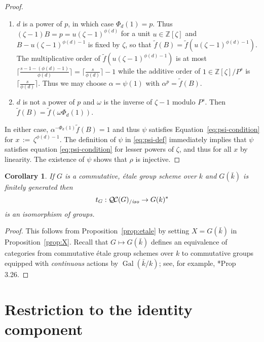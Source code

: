\documentclass[11pt]{amsart}
\theoremstyle{plain}
\newtheorem{corollary}[theorem]{Corollary}
\theoremstyle{definition}
\theoremstyle{remark}
\newcommand{\ZZ}{{\mathbb{Z}}}
\newcommand{\bFq}{\bar{k}}
\newcommand{\Fq}{k}
\DeclareMathOperator{\Gal}{Gal}
\newcommand{\ceq}{{\, :=\, }}
\newcommand{\QC}{{\mathcal{Q\hskip-0.8pt C}}}
\newcommand{\QCiso}[1]{\QC(#1)_{/\textit{iso}}}
\newcommand{\trFrob}[1]{t_{#1}}
\begin{document}
\begin{proof}
  \begin{enumerate}
  \item $d$ is a power of $p$, in which case $\Phi_d(1) = p$.  Thus
    $(\zeta-1)B = p = u(\zeta-1)^{\phi(d)}$ for a unit $u \in \ZZ[\zeta]$
    and $B - u(\zeta-1)^{\phi(d)-1}$ is fixed by $\zeta$,
    so that $\tilde{f}(B) = \tilde{f}(u(\zeta - 1)^{\phi(d)-1})$.  The
    multiplicative order of $\tilde{f}(u(\zeta-1)^{\phi(d)-1})$ is at most
    $\lceil \frac{s - 1 - (\phi(d)-1)}{\phi(d)}\rceil = \lceil \frac{s}{\phi(d)} \rceil - 1$
    while the additive order of $1 \in \ZZ[\zeta]/P^s$ is $\lceil \frac{s}{\phi(d)} \rceil$.
    Thus we may choose $\alpha = \psi(1)$ with $\alpha^p = \tilde{f}(B)$.
  \item $d$ is not a power of $p$ and $\omega$ is the inverse of
    $\zeta-1$ modulo $P^s$.  Then $\tilde{f}(B) = \tilde{f}(\omega\Phi_d(1))$.
  \end{enumerate}
  In either case, $\alpha^{-\Phi_d(1)}\tilde{f}(B) = 1$ and thus
  $\psi$ satisfies Equation~\eqref{eq:psi-condition} for
  $x \ceq \zeta^{\phi(d)-1}$.  The definition of $\psi$ in \ref{eq:psi-def}
  immediately implies that $\psi$ satisfies equation
  \ref{eq:psi-condition} for lesser powers of $\zeta$, and thus for
  all $x$ by linearity.  The existence of $\psi$ shows that $\rho$ is injective.
\end{proof}

\begin{corollary}
 If $G$ is a commutative, \'etale group scheme over $\Fq$ and $G(\bFq)$ is finitely
 generated then
  \[
  \trFrob{G} : \QCiso{G} \to G(\Fq)^*
  \]
  is an isomorphism of groups.
\end{corollary}
\begin{proof}
This follows from Proposition~\ref{prop:etale} by setting $X=G(\bFq)$ in Proposition~\ref{prop:X}.
Recall that $G \mapsto G(\bFq)$ defines an equivalence of categories from commutative \'etale group schemes over $\Fq$ to commutative groups equipped with \emph{continuous} actions by $\Gal(\bFq/\Fq)$; see, for example, \cite{vdGeer-Moonen:AbelianVarieties}*{Prop 3.26}.
\end{proof}

\section{Restriction to the identity component} \label{sec:restriction}

%
\end{document}
